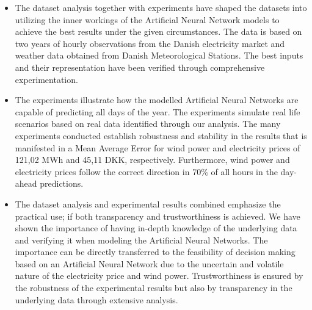 \begin{itemize}
\item The dataset analysis together with experiments have shaped the datasets into utilizing the inner workings of the Artificial Neural Network models to achieve the best results under the given circumstances. The data is based on two years of hourly observations from the Danish electricity market and weather data obtained from Danish Meteorological Stations. The best inputs and their representation have been verified through comprehensive experimentation.   
\item The experiments illustrate how the modelled Artificial Neural Networks are capable of predicting all days of the year. The experiments simulate real life scenarios based on real data identified through our analysis. The many experiments conducted establish robustness and stability in the results that is manifested in a Mean Average Error for wind power and electricity prices of 121,02 MWh and 45,11 DKK, respectively. Furthermore, wind power and electricity prices follow the correct direction in 70\% of all hours in the day-ahead predictions. 
\item The dataset analysis and experimental results combined emphasize the practical use; if both transparency and trustworthiness is achieved. We have shown the importance of having in-depth knowledge of the underlying data and verifying it when modeling the Artificial Neural Networks. The importance can be directly transferred to the feasibility of decision making based on an Artificial Neural Network due to the uncertain and volatile nature of the electricity price and wind power. Trustworthiness is ensured by the robustness of the experimental results but also by transparency in the underlying data through extensive analysis. 
\end{itemize}
